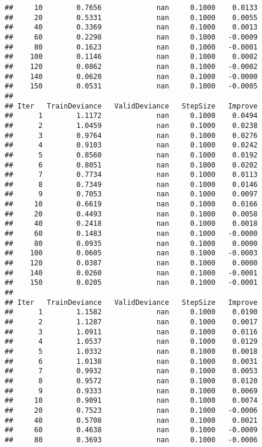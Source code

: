 \documentclass[]{article}
\begin{document}
\begin{verbatim}
##     10        0.7656             nan     0.1000    0.0133
##     20        0.5331             nan     0.1000    0.0055
##     40        0.3369             nan     0.1000    0.0013
##     60        0.2298             nan     0.1000   -0.0009
##     80        0.1623             nan     0.1000   -0.0001
##    100        0.1146             nan     0.1000    0.0002
##    120        0.0862             nan     0.1000   -0.0002
##    140        0.0620             nan     0.1000   -0.0000
##    150        0.0531             nan     0.1000   -0.0005
## 
## Iter   TrainDeviance   ValidDeviance   StepSize   Improve
##      1        1.1172             nan     0.1000    0.0494
##      2        1.0459             nan     0.1000    0.0238
##      3        0.9764             nan     0.1000    0.0276
##      4        0.9103             nan     0.1000    0.0242
##      5        0.8560             nan     0.1000    0.0192
##      6        0.8051             nan     0.1000    0.0202
##      7        0.7734             nan     0.1000    0.0113
##      8        0.7349             nan     0.1000    0.0146
##      9        0.7053             nan     0.1000    0.0097
##     10        0.6619             nan     0.1000    0.0166
##     20        0.4493             nan     0.1000    0.0058
##     40        0.2418             nan     0.1000    0.0018
##     60        0.1483             nan     0.1000   -0.0000
##     80        0.0935             nan     0.1000    0.0000
##    100        0.0605             nan     0.1000   -0.0003
##    120        0.0387             nan     0.1000    0.0000
##    140        0.0260             nan     0.1000   -0.0001
##    150        0.0205             nan     0.1000   -0.0001
## 
## Iter   TrainDeviance   ValidDeviance   StepSize   Improve
##      1        1.1582             nan     0.1000    0.0190
##      2        1.1287             nan     0.1000    0.0017
##      3        1.0911             nan     0.1000    0.0116
##      4        1.0537             nan     0.1000    0.0129
##      5        1.0332             nan     0.1000    0.0018
##      6        1.0138             nan     0.1000    0.0031
##      7        0.9932             nan     0.1000    0.0053
##      8        0.9572             nan     0.1000    0.0120
##      9        0.9333             nan     0.1000    0.0069
##     10        0.9091             nan     0.1000    0.0074
##     20        0.7523             nan     0.1000   -0.0006
##     40        0.5708             nan     0.1000    0.0021
##     60        0.4638             nan     0.1000   -0.0009
##     80        0.3693             nan     0.1000   -0.0006

\end{verbatim}
\end{document}
